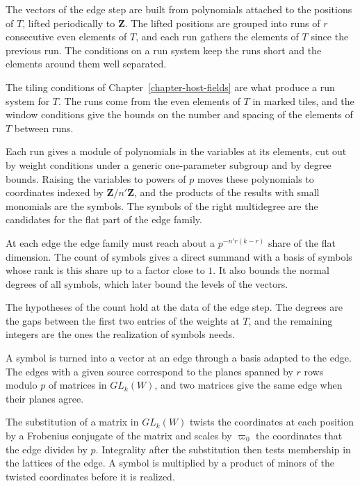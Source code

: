 The vectors of the edge step are built from polynomials attached to the positions of $T$, lifted
periodically to $\mathbf Z$. The lifted positions are grouped into runs of $r$ consecutive even
elements of $T$, and each run gathers the elements of $T$ since the previous run. The conditions on a
run system keep the runs short and the elements around them well separated.

The tiling conditions of Chapter~\ref{chapter-host-fields} are what produce a run system for $T$.
The runs come from the even elements of $T$ in marked tiles, and the window conditions give the
bounds on the number and spacing of the elements of $T$ between runs.

Each run gives a module of polynomials in the variables at its elements, cut out by weight conditions
under a generic one-parameter subgroup and by degree bounds. Raising the variables to powers of $p$
moves these polynomials to coordinates indexed by $\mathbf Z/n'\mathbf Z$, and the products of the
results with small monomials are the symbols. The symbols of the right multidegree are the
candidates for the flat part of the edge family.

At each edge the edge family must reach about a $p^{-n'r(k-r)}$ share of the flat dimension. The count
of symbols gives a direct summand with a basis of symbols whose rank is this share up to a factor
close to $1$. It also bounds the normal degrees of all symbols, which later bound the levels of the
vectors.

The hypotheses of the count hold at the data of the edge step. The degrees are the gaps between the
first two entries of the weights at $T$, and the remaining integers are the ones the realization of
symbols needs.

A symbol is turned into a vector at an edge through a basis adapted to the edge. The edges with a
given source correspond to the planes spanned by $r$ rows modulo $p$ of matrices in $GL_k(W)$, and
two matrices give the same edge when their planes agree.

The substitution of a matrix in $GL_k(W)$ twists the coordinates at each position by a Frobenius
conjugate of the matrix and scales by $\varpi_0$ the coordinates that the edge divides by $p$.
Integrality after the substitution then tests membership in the lattices of the edge. A symbol is
multiplied by a product of minors of the twisted coordinates before it is realized.

